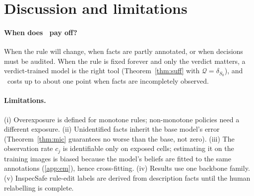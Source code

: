 \section{Discussion and limitations}
\label{sec:discussion}

\paragraph{When does \lux\ pay off?} When the rule will change, when facts are partly annotated, or when decisions must be audited. When the rule is fixed forever and only the verdict matters, a verdict-trained model is the right tool (Theorem~\ref{thm:suff} with $\mathcal Q=\delta_{S_0}$), and \lux\ costs up to about one point when facts are incompletely observed.

\paragraph{Limitations.} (i) Overexposure is defined for monotone rules; non-monotone policies need a different exposure. (ii) Unidentified facts inherit the base model's error (Theorem~\ref{thm:mic} guarantees no worse than the base, not zero). (iii) The observation rate $c_j$ is identifiable only on exposed cells; estimating it on the training images is biased because the model's beliefs are fitted to the same annotations (\cref{app:em}), hence cross-fitting. (iv) Results use one backbone family. (v) InspecSafe rule-edit labels are derived from description facts until the human relabelling is complete.
